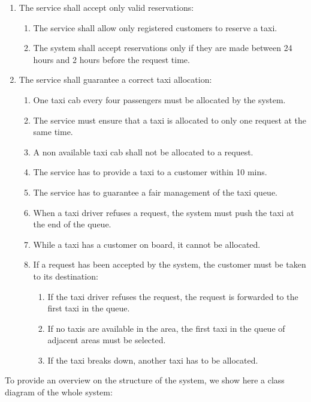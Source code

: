 \begin{enumerate}
	\item The service shall accept only valid reservations: \begin{enumerate}
		\item The service shall allow only registered customers to reserve a taxi.
		\item The system shall accept reservations only if they are made between 24 hours and 2 hours before the request time.
	\end{enumerate}
	
	\item The service shall guarantee a correct taxi allocation: \begin{enumerate}
		\item One taxi cab every four passengers must be allocated by the system.
		\item The service must ensure that a taxi is allocated to only one request at the same time.
		\item A non available taxi cab shall not be allocated to a request.
		\item The service has to provide a taxi to a customer within 10 mins.
		\item The service has to guarantee a fair management of the taxi queue.
		\item When a taxi driver refuses a request, the system must push the taxi at the end of the queue.
		\item While a taxi has a customer on board, it cannot be allocated.
		\item If a request has been accepted by the system, the customer must be taken to its destination: \begin{enumerate}
			\item If the taxi driver refuses the request, the request is forwarded to the first taxi in the queue.
			\item If no taxis are available in the area, the first taxi in the queue of adjacent areas must be selected.
			\item If the taxi breaks down, another taxi has to be allocated.
		\end{enumerate}
	\end{enumerate}
 
\end{enumerate}


To provide an overview on the structure of the system, we show here a class diagram of the whole system:


